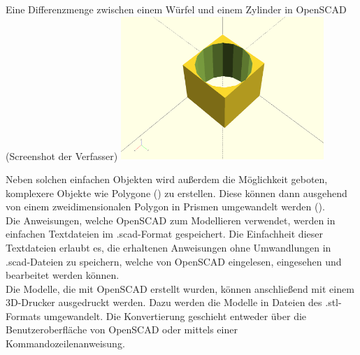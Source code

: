 \begin{Bild}{Eine Differenzmenge zwischen einem Würfel und einem Zylinder in OpenSCAD (Screenshot der Verfasser)}
	\includegraphics[width= 290px]{Bilder/OpenSCAD_Example}
\end{Bild}

Neben solchen einfachen Objekten wird außerdem die Möglichkeit geboten, komplexere Objekte wie Polygone () zu erstellen.
Diese können dann ausgehend von einem zweidimensionalen Polygon in Prismen umgewandelt werden (). \\

Die Anweisungen, welche OpenSCAD zum Modellieren verwendet, werden in einfachen Textdateien im .scad-Format gespeichert.
Die Einfachheit dieser Textdateien erlaubt es, die erhaltenen Anweisungen ohne Umwandlungen in .scad-Dateien zu speichern, welche von OpenSCAD eingelesen, eingesehen und bearbeitet werden können. \\

Die Modelle, die mit OpenSCAD erstellt wurden, können anschließend mit einem 3D-Drucker ausgedruckt werden.
Dazu werden die Modelle in Dateien des .stl-Formats umgewandelt.
Die Konvertierung geschieht entweder über die Benutzeroberfläche von OpenSCAD oder mittels einer Kommandozeilenanweisung.


